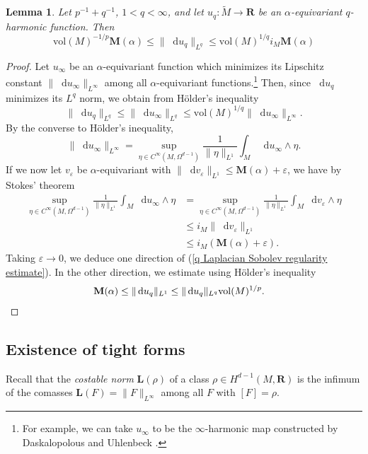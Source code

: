 \documentclass[reqno,11pt]{amsart}
\newcommand{\RR}{\mathbf{R}}
\newcommand*\dif{\mathop{}\!\mathrm{d}}
\newcommand{\vol}{\mathrm{vol}}
\newcommand{\Mass}{\mathbf M}
\newcommand{\Comass}{\mathbf L}
\newcommand{\dfn}[1]{\emph{#1}\index{#1}}
\newtheorem{lemma}[theorem]{Lemma}
\theoremstyle{definition}
\numberwithin{equation}{section}
\begin{document}
\begin{lemma}
Let $p^{-1} + q^{-1}$, $1 < q < \infty$, and let $u_q: \tilde M \to \RR$ be an $\alpha$-equivariant $q$-harmonic function.
Then
\begin{equation}\label{q Laplacian Sobolev regularity estimate}
\vol(M)^{-1/p} \Mass(\alpha) \leq \|\dif u_q\|_{L^q} \leq \vol(M)^{1/q} i_M \Mass(\alpha)
\end{equation}
\end{lemma}
\begin{proof}
Let $u_\infty$ be an $\alpha$-equivariant function which minimizes its Lipschitz constant $\|\dif u_\infty\|_{L^\infty}$ among all $\alpha$-equivariant functions.\footnote{For example, we can take $u_\infty$ to be the $\infty$-harmonic map constructed by Daskalopolous and Uhlenbeck \cite[\S2]{daskalopoulos2020transverse}.}
Then, since $\dif u_q$ minimizes its $L^q$ norm, we obtain from H\"older's inequality
$$\|\dif u_q\|_{L^q} \leq \|\dif u_\infty\|_{L^q} \leq \vol(M)^{1/q} \|\dif u_\infty\|_{L^\infty}.$$
By the converse to H\"older's inequality, 
$$\|\dif u_\infty\|_{L^\infty} = \sup_{\eta \in C^\infty(M, \Omega^{d - 1})} \frac{1}{\|\eta\|_{L^1}} \int_M \dif u_\infty \wedge \eta.$$
If we now let $v_\varepsilon$ be $\alpha$-equivariant with $\|\dif v_\varepsilon\|_{L^1} \leq \Mass(\alpha) + \varepsilon$, we have by Stokes' theorem
\begin{align*}
\sup_{\eta \in C^\infty(M, \Omega^{d - 1})} \frac{1}{\|\eta\|_{L^1}} \int_M \dif u_\infty \wedge \eta 
&= \sup_{\eta \in C^\infty(M, \Omega^{d - 1})} \frac{1}{\|\eta\|_{L^1}} \int_M \dif v_\varepsilon \wedge \eta\\
&\leq i_M \|\dif v_\varepsilon\|_{L^1} \\
&\leq i_M(\Mass(\alpha) + \varepsilon).
\end{align*}
Taking $\varepsilon \to 0$, we deduce one direction of (\ref{q Laplacian Sobolev regularity estimate}).
In the other direction, we estimate using H\"older's inequality
\begin{align*}
\Mass(\alpha) &\leq \|\dif u_q\|_{L^1} \leq \|\dif u_q\|_{L^q} \vol(M)^{1/p}. \qedhere 
\end{align*}
\end{proof}

\subsection{\texorpdfstring{Existence of tight forms}{Existence of tight forms}}
Recall that the \dfn{costable norm} $\Comass(\rho)$ of a class $\rho \in H^{d - 1}(M, \RR)$ is the infimum of the comasses $\Comass(F) = \|F\|_{L^\infty}$ among all $F$ with $[F] = \rho$.
\end{document}
